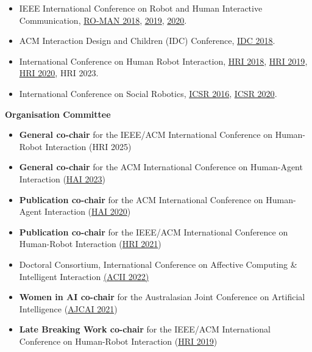 \begin{itemize}
\begin{itemize}
        \item IEEE International Conference on Robot and Human Interactive Communication, \href{http://ro-man2018.org/}{RO-MAN 2018}, \href{http://ro-man2019.org/}{2019}, \href{http://ro-man2020.org/}{2020}.
        \item ACM Interaction Design and Children (IDC) Conference, \href{http://idc-2018.org/}{IDC 2018}.
        \item International Conference on Human Robot Interaction, \href{http://humanrobotinteraction.org/2018/}{HRI 2018}, \href{http://humanrobotinteraction.org/2019/}{HRI 2019}, \href{http://humanrobotinteraction.org/2020/}{HRI 2020}, HRI 2023.
        \item International Conference on Social Robotics, \href{http://icsr2016.engr.ku.edu/}{ICSR 2016}, \href{https://sites.psu.edu/icsr2020/}{ICSR 2020}.
    \end{itemize}
\end{itemize}

\textbf{Organisation Committee}
\begin{itemize}
    \item \textbf{General co-chair} for the  IEEE/ACM International Conference on Human-Robot Interaction (HRI 2025)
    \item \textbf{General co-chair} for the  ACM International Conference on Human-Agent Interaction (\href{http://hai-conference.net/hai2023/}{HAI 2023})
    \item \textbf{Publication co-chair} for the  ACM International Conference on Human-Agent Interaction (\href{http://hai-conference.net/hai2020/}{HAI 2020})
    \item \textbf{Publication co-chair} for the IEEE/ACM International Conference on Human-Robot Interaction (\href{https://humanrobotinteraction.org/2021/}{HRI 2021})
    \item Doctoral Consortium,  International Conference on Affective Computing \& Intelligent Interaction \href{https://acii-conf.net/2022/calls/call-for-doctoral-consortium/}{(ACII 2022)}
    \item[$\diamond$] \textbf{Women in AI co-chair} for the  Australasian Joint Conference on Artificial Intelligence (\href{http://www.ajcai2021.net/}{AJCAI 2021})
    \item \textbf{Late Breaking Work co-chair} for the IEEE/ACM International Conference on Human-Robot Interaction (\href{https://humanrobotinteraction.org/2019/}{HRI 2019})
\end{itemize}

